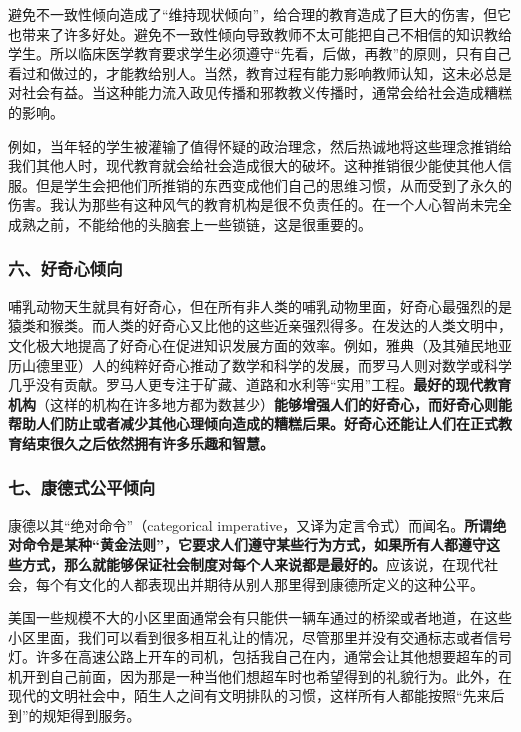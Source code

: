 避免不一致性倾向造成了“维持现状倾向”，给合理的教育造成了巨大的伤害，但它也带来了许多好处。避免不一致性倾向导致教师不太可能把自己不相信的知识教给学生。所以临床医学教育要求学生必须遵守“先看，后做，再教”的原则，只有自己看过和做过的，才能教给别人。当然，教育过程有能力影响教师认知，这未必总是对社会有益。当这种能力流入政见传播和邪教教义传播时，通常会给社会造成糟糕的影响。
\par

例如，当年轻的学生被灌输了值得怀疑的政治理念，然后热诚地将这些理念推销给我们其他人时，现代教育就会给社会造成很大的破坏。这种推销很少能使其他人信服。但是学生会把他们所推销的东西变成他们自己的思维习惯，从而受到了永久的伤害。我认为那些有这种风气的教育机构是很不负责任的。在一个人心智尚未完全成熟之前，不能给他的头脑套上一些锁链，这是很重要的。
\par

\subsubsection*{六、好奇心倾向}

哺乳动物天生就具有好奇心，但在所有非人类的哺乳动物里面，好奇心最强烈的是猿类和猴类。而人类的好奇心又比他的这些近亲强烈得多。在发达的人类文明中，文化极大地提高了好奇心在促进知识发展方面的效率。例如，雅典（及其殖民地亚历山德里亚）人的纯粹好奇心推动了数学和科学的发展，而罗马人则对数学或科学几乎没有贡献。罗马人更专注于矿藏、道路和水利等“实用”工程。\textbf{最好的现代教育机构}（这样的机构在许多地方都为数甚少）\textbf{能够增强人们的好奇心，而好奇心则能帮助人们防止或者减少其他心理倾向造成的糟糕后果。好奇心还能让人们在正式教育结束很久之后依然拥有许多乐趣和智慧。}
\par

\subsubsection*{七、康德式公平倾向}

康德以其“绝对命令”（categorical imperative，又译为定言令式）而闻名。\textbf{所谓绝对命令是某种“黄金法则”，它要求人们遵守某些行为方式，如果所有人都遵守这些方式，那么就能够保证社会制度对每个人来说都是最好的。}应该说，在现代社会，每个有文化的人都表现出并期待从别人那里得到康德所定义的这种公平。
\par

美国一些规模不大的小区里面通常会有只能供一辆车通过的桥梁或者地道，在这些小区里面，我们可以看到很多相互礼让的情况，尽管那里并没有交通标志或者信号灯。许多在高速公路上开车的司机，包括我自己在内，通常会让其他想要超车的司机开到自己前面，因为那是一种当他们想超车时也希望得到的礼貌行为。此外，在现代的文明社会中，陌生人之间有文明排队的习惯，这样所有人都能按照“先来后到”的规矩得到服务。
\par

